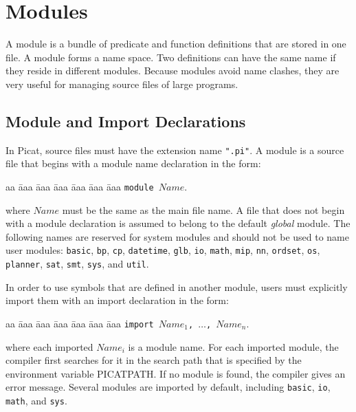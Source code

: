 \chapter{Modules}
A module is a bundle of predicate and function definitions that are stored in one file. A module forms a name space.  Two definitions can have the same name if they reside in different modules. Because modules avoid name clashes, they are very useful for managing source files of large programs.

\section{Module and Import Declarations}
In Picat, source files must have the extension name \texttt{".pi"}.  A module is a source file that begins with a module name declaration in the form:
\begin{tabbing}
aa \= aaa \= aaa \= aaa \= aaa \= aaa \= aaa \kill
\> \texttt{module $Name$}.
\end{tabbing}
where $Name$ must be the same as the main file name. A file that does not begin with a module declaration is assumed to belong to the default \emph{global} module. The following names are reserved for system modules and should not be used to name user modules: \texttt{basic}, \texttt{bp}, \texttt{cp}, \texttt{datetime}, \texttt{glb},  \texttt{io}, \texttt{math}, \texttt{mip}, \texttt{nn}, \texttt{ordset}, \texttt{os}, \texttt{planner}, \texttt{sat}, \texttt{smt}, \texttt{sys},  and \texttt{util}.

In order to use symbols that are defined in another module, users must explicitly import them with an import declaration in the form:
\begin{tabbing}
aa \= aaa \= aaa \= aaa \= aaa \= aaa \= aaa \kill
\> \texttt{import $Name_1$, $\ldots$, $Name_n$}.
\end{tabbing}
where each imported $Name_i$ is a module name. For each imported module, the compiler first searches for it in the search path that is specified by the environment variable PICATPATH. If no module is found, the compiler gives an error message. Several modules are imported by default, including  \texttt{basic}, \texttt{io}, \texttt{math},  and \texttt{sys}.

